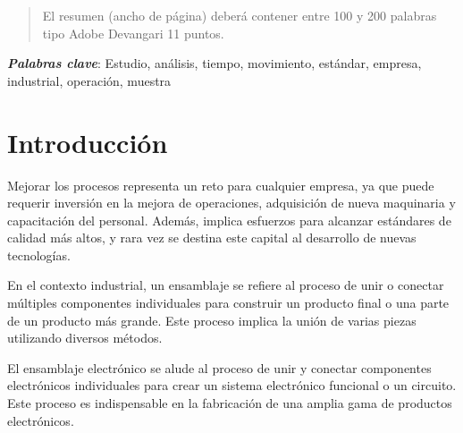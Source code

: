     \maketitle
    \thispagestyle{fancy}
    
    
    
    \begin{abstract}
    \noindent 
    El resumen (ancho de página) deberá contener entre 100 y 200 palabras tipo Adobe Devangari 11 puntos.
    
    \end{abstract}
    \textbf{\textit{Palabras clave}}: {Estudio, análisis, tiempo, movimiento, estándar, empresa, industrial, operación, muestra}
    
    \section{Introducción}
    
    Mejorar los procesos representa un reto para cualquier empresa, ya que puede requerir inversión en la mejora de operaciones, adquisición de nueva maquinaria y capacitación del personal. Además, implica esfuerzos para alcanzar estándares de calidad más altos, y rara vez se destina este capital al desarrollo de nuevas tecnologías. \cite{83520408}
    
    
    En el contexto industrial, un ensamblaje se refiere al proceso de unir o conectar múltiples componentes individuales para construir un producto final o una parte de un producto más grande. Este proceso implica la unión de varias piezas utilizando diversos métodos.
    
    
    
    El ensamblaje electrónico se alude al proceso de unir y conectar componentes electrónicos individuales para crear un sistema electrónico funcional o un circuito. Este proceso es indispensable en la fabricación de una amplia gama de productos electrónicos.
    
